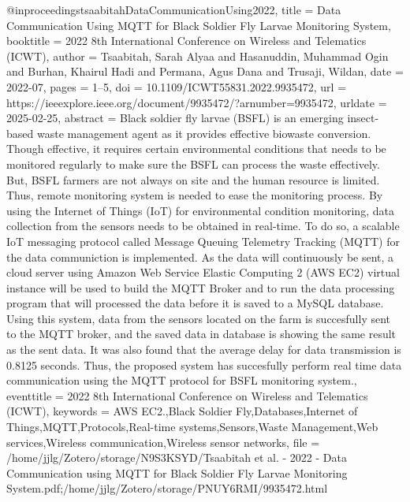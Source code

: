 {{{{@inproceedings{tsaabitahDataCommunicationUsing2022,
  title = {Data {{Communication}} Using {{MQTT}} for {{Black Soldier Fly Larvae Monitoring System}}},
  booktitle = {2022 8th {{International Conference}} on {{Wireless}} and {{Telematics}} ({{ICWT}})},
  author = {Tsaabitah, Sarah Alyaa and Hasanuddin, Muhammad Ogin and Burhan, Khairul Hadi and Permana, Agus Dana and Trusaji, Wildan},
  date = {2022-07},
  pages = {1--5},
  doi = {10.1109/ICWT55831.2022.9935472},
  url = {https://ieeexplore.ieee.org/document/9935472/?arnumber=9935472},
  urldate = {2025-02-25},
  abstract = {Black soldier fly larvae (BSFL) is an emerging insect-based waste management agent as it provides effective biowaste conversion. Though effective, it requires certain environmental conditions that needs to be monitored regularly to make sure the BSFL can process the waste effectively. But, BSFL farmers are not always on site and the human resource is limited. Thus, remote monitoring system is needed to ease the monitoring process. By using the Internet of Things (IoT) for environmental condition monitoring, data collection from the sensors needs to be obtained in real-time. To do so, a scalable IoT messaging protocol called Message Queuing Telemetry Tracking (MQTT) for the data communiction is implemented. As the data will continuously be sent, a cloud server using Amazon Web Service Elastic Computing 2 (AWS EC2) virtual instance will be used to build the MQTT Broker and to run the data processing program that will processed the data before it is saved to a MySQL database. Using this system, data from the sensors located on the farm is succesfully sent to the MQTT broker, and the saved data in database is showing the same result as the sent data. It was also found that the average delay for data transmission is 0.8125 seconds. Thus, the proposed system has succesfully perform real time data communication using the MQTT protocol for BSFL monitoring system.},
  eventtitle = {2022 8th {{International Conference}} on {{Wireless}} and {{Telematics}} ({{ICWT}})},
  keywords = {AWS EC2.,Black Soldier Fly,Databases,Internet of Things,MQTT,Protocols,Real-time systems,Sensors,Waste Management,Web services,Wireless communication,Wireless sensor networks},
  file = {/home/jjlg/Zotero/storage/N9S3KSYD/Tsaabitah et al. - 2022 - Data Communication using MQTT for Black Soldier Fly Larvae Monitoring System.pdf;/home/jjlg/Zotero/storage/PNUY6RMI/9935472.html}
}

}}}}
